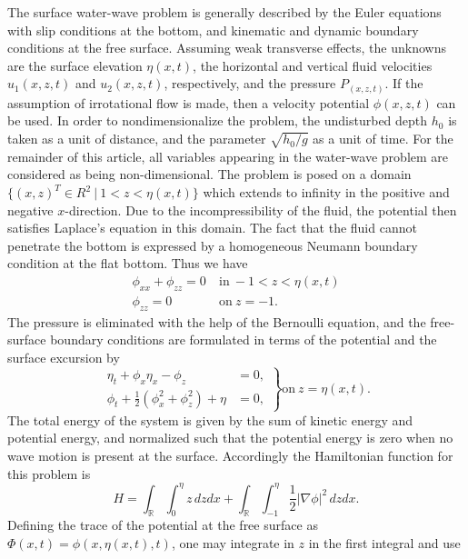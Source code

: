 The surface water-wave problem is generally described by the
Euler equations with slip conditions at the bottom, and kinematic
and dynamic boundary conditions at the free surface. Assuming
weak transverse effects, the unknowns are the surface elevation
$\eta ( x , t )$, the horizontal and vertical fluid velocities $u_1 ( x , z , t )$
and $u_2 ( x , z , t )$, respectively, and the pressure $P_( x , z , t )$. If the
assumption of irrotational flow is made, then a velocity potential
$\phi( x , z , t )$ can be used. In order to nondimensionalize the problem,
the undisturbed depth $h_0$ is taken as a unit of distance, and the
parameter $\sqrt{h_0 / g}$ as a unit of time. For the remainder of this article,
all variables appearing in the water-wave problem are considered
as being non-dimensional. The problem is posed on a domain
$\lbrace( x , z )^T \in R^2 ~|~ 1 < z < \eta( x , t )\rbrace$ which extends to infinity in the
positive and negative $x$-direction. Due to the incompressibility of
the fluid, the potential then satisfies Laplace’s equation in this
domain. The fact that the fluid cannot penetrate the bottom is
expressed by a homogeneous Neumann boundary condition at the
flat bottom. Thus we have
%
\begin{align*}
	\phi_{xx} + \phi_{zz} = 0 ~ &\mbox{in} ~ -1< z < \eta(x,t) \\
	\phi_{zz} = 0 ~ &\mbox{on} ~ z = -1.
\end{align*}
%
The pressure is eliminated with the help of the Bernoulli equation,
and the free-surface boundary conditions are formulated in terms
of the potential and the surface excursion by
%
\begin{equation*}
	\left.
		\begin{array}{rc}
			\eta_t+\phi_x\eta_x-\phi_z
			& =0,
			\\
			\phi_t+\frac{1}{2} \left( \phi^2_x+\phi^2_z \right) + \eta
			& = 0, 
		\end{array}
	\right\}
	\mbox{on} \ z=\eta(x,t).
\end{equation*}
%
The total energy of the system is given by the sum of kinetic energy and potential energy, and normalized such that the potential
energy is zero when no wave motion is present at the surface. Accordingly the Hamiltonian function for this problem is
%
\begin{equation}
	H = \int _{\mathbb{R}} \int_0^\eta z \, dz dx +
	\int _{\mathbb{R}} \int_{-1}^\eta \frac{1}{2} |\nabla \phi|^2 \, dz dx.
\end{equation}
%
Defining the trace of the potential at the free surface as $\Phi( x , t ) = \phi( x , \eta( x , t ), t )$, one may integrate in $z$ in the first integral and use
